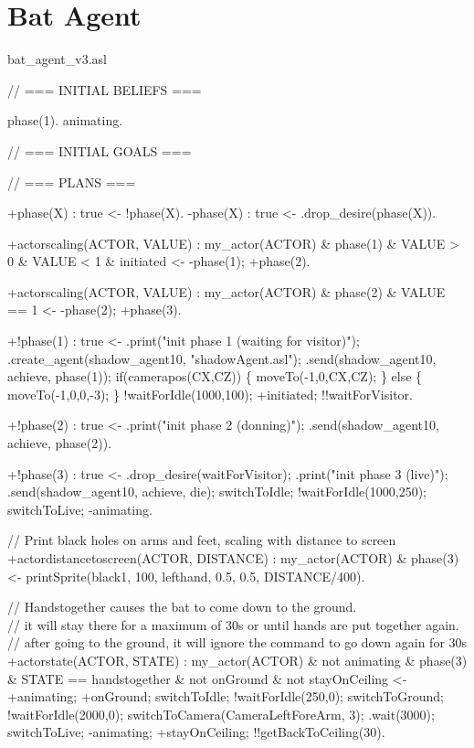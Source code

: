 \documentclass[draft,final]{vutinfth} %
\begin{document}
\normalsize
\section{Bat Agent}
{\ttfamily\scriptsize\raggedright
bat\_agent\_v3.asl

// === INITIAL BELIEFS ===

phase(1).
animating.

// === INITIAL GOALS ===

// === PLANS ===

+phase(X) : true <- !phase(X).
-phase(X) : true <- .drop\_desire(phase(X)).

+actorscaling(ACTOR, VALUE) : my\_actor(ACTOR) \& phase(1) \& VALUE > 0 \& VALUE < 1 \& initiated
        <-  -phase(1);
            +phase(2).

+actorscaling(ACTOR, VALUE) : my\_actor(ACTOR) \& phase(2) \& VALUE == 1
        <-  -phase(2);
            +phase(3).

+!phase(1) : true
        <-  .print("init phase 1 (waiting for visitor)");
            .create\_agent(shadow\_agent10, "shadowAgent.asl");
            .send(shadow\_agent10, achieve, phase(1));
            if(camerapos(CX,CZ))
            \{
               moveTo(-1,0,CX,CZ);             
            \}
            else
            \{
                moveTo(-1,0,0,-3);           
            \}
            !waitForIdle(1000,100);
            +initiated;
            !!waitForVisitor.

+!phase(2) : true
        <-  .print("init phase 2 (donning)");
            .send(shadow\_agent10, achieve, phase(2)).

+!phase(3) : true
        <-  .drop\_desire(waitForVisitor);
            .print("init phase 3 (live)");
            .send(shadow\_agent10, achieve, die);
            switchToIdle;
            !waitForIdle(1000,250);
            switchToLive;
            -animating.

// Print black holes on arms and feet, scaling with distance to screen\\
+actordistancetoscreen(ACTOR, DISTANCE) : my\_actor(ACTOR) \& phase(3)
    <-  printSprite(black1, 100, lefthand, 0.5, 0.5, DISTANCE/400).

// Handstogether causes the bat to come down to the ground. \\
// it will stay there for a maximum of 30s or until hands are put together again.\\
// after going to the ground, it will ignore the command to go down again for 30s\\
+actorstate(ACTOR, STATE) : my\_actor(ACTOR) \& not animating \& phase(3) \& STATE == handstogether \& not onGround \& not stayOnCeiling
    <-  +animating;
        +onGround;
        switchToIdle;
        !waitForIdle(250,0);
        switchToGround;
        !waitForIdle(2000,0);
        switchToCamera(CameraLeftForeArm, 3);
        .wait(3000);
        switchToLive;
        -animating;
        +stayOnCeiling;
        !!getBackToCeiling(30).

}
\end{document}
